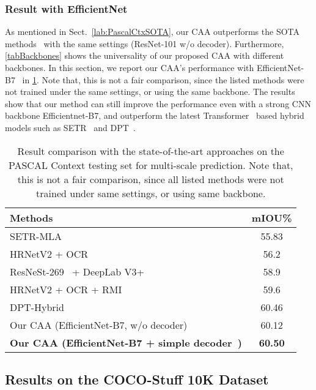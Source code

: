 \documentclass[journal]{IEEEtran}
\begin{document}
\subsubsection{Result with EfficientNet}

As mentioned in Sect.~\ref{lab:PascalCtxSOTA}, our CAA outperforms the SOTA methods~\cite{cCFNet, cEMANet} with the same settings (ResNet-101 w/o decoder). Furthermore, \tablename{ \ref{tabBackbones}} shows the universality of our proposed CAA with different backbones. 
In this section, we report our CAA's performance with EfficientNet-B7~\cite{cEfficientNet} in \tablename{\ref{tabPascalContextFree}}. 
Note that, this is not a fair comparison, since the listed methods were not trained under the same settings, or using the same backbone. 
The results show that our method can still improve the performance even with a strong CNN backbone Efficientnet-B7, and outperform the latest Transformer~\cite{cViT} based hybrid models such as SETR~\cite{cSETR} and DPT~\cite{cDPT}. \\


\begin{table}[t]
	\centering
\caption{Result comparison with the state-of-the-art approaches on the PASCAL Context testing set for multi-scale prediction. Note that, this is not a fair comparison, since all listed methods were not trained under same settings, or using same backbone.}
	\begin{tabular}{l|c}
		\toprule[1pt]
		\rule{0pt}{2ex} Methods & mIOU\% \\
		\midrule[0.5pt]
		\midrule[0.5pt]
		SETR-MLA~\cite{cSETR} & 55.83 \\
		HRNetV2 + OCR ~\cite{cSVCNet} & 56.2\\
		ResNeSt-269~\cite{cResnest} + DeepLab V3+~\cite{cDeepLabV3Plus} & 58.9 \\
		HRNetV2 + OCR + RMI ~\cite{cOCR} & 59.6 \\
		DPT-Hybrid~\cite{cDPT} & 60.46 \\
		\midrule[0.5pt]
		Our CAA (EfficientNet-B7, w/o decoder) & 60.12 \\
		\textbf{Our CAA (EfficientNet-B7 + simple decoder~\cite{cDeepLabV3Plus}) } & \textbf{60.50}\\
		\bottomrule[1pt]
	\end{tabular}
	\label{tabPascalContextFree}
\end{table}



\subsection{Results on the COCO-Stuff 10K Dataset}
\end{document}
